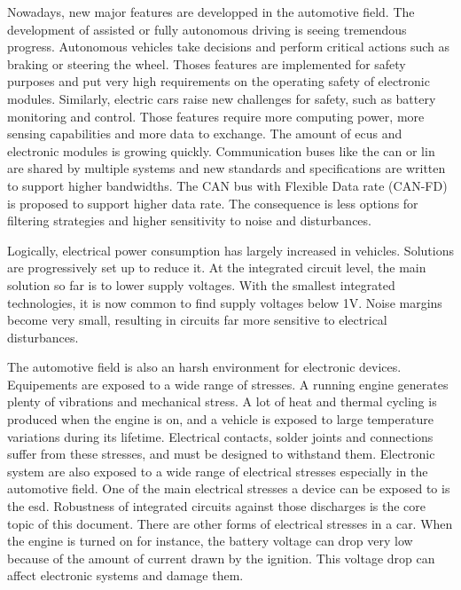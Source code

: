Nowadays, new major features are developped in the automotive field.
The development of assisted or fully autonomous driving is seeing tremendous progress.
Autonomous vehicles take decisions and perform critical actions such as braking or steering the wheel.
Thoses features are implemented for safety purposes and put very high requirements on the operating safety of electronic modules.
Similarly, electric cars raise new challenges for safety, such as battery monitoring and control.
Those features require more computing power, more sensing capabilities and more data to exchange.
The amount of \gls{ecu}s and electronic modules is growing quickly.
Communication buses like the \gls{can} \cite{CAN} or \gls{lin} \cite{LIN} are shared by multiple systems and new standards and specifications are written to support higher bandwidths.
The CAN bus with Flexible Data rate (CAN-FD) is proposed to support higher data rate.
The consequence is less options for filtering strategies and higher sensitivity to noise and disturbances.

Logically, electrical power consumption has largely increased in vehicles.
Solutions are progressively set up to reduce it.
At the integrated circuit level, the main solution so far is to lower supply voltages.
With the smallest integrated technologies, it is now common to find supply voltages below 1V.
Noise margins become very small, resulting in circuits far more sensitive to electrical disturbances.

The automotive field is also an harsh environment for electronic devices.
Equipements are exposed to a wide range of stresses.
A running engine generates plenty of vibrations and mechanical stress.
A lot of heat and thermal cycling is produced when the engine is on, and a vehicle is exposed to large temperature variations during its lifetime.
Electrical contacts, solder joints and connections suffer from these stresses, and must be designed to withstand them.
Electronic system are also exposed to a wide range of electrical stresses especially in the automotive field.
One of the main electrical stresses a device can be exposed to is the \gls{esd}.
Robustness of integrated circuits against those discharges is the core topic of this document.
There are other forms of electrical stresses in a car.
When the engine is turned on for instance, the battery voltage can drop very low because of the amount of current drawn by the ignition.
This voltage drop can affect electronic systems and damage them.

